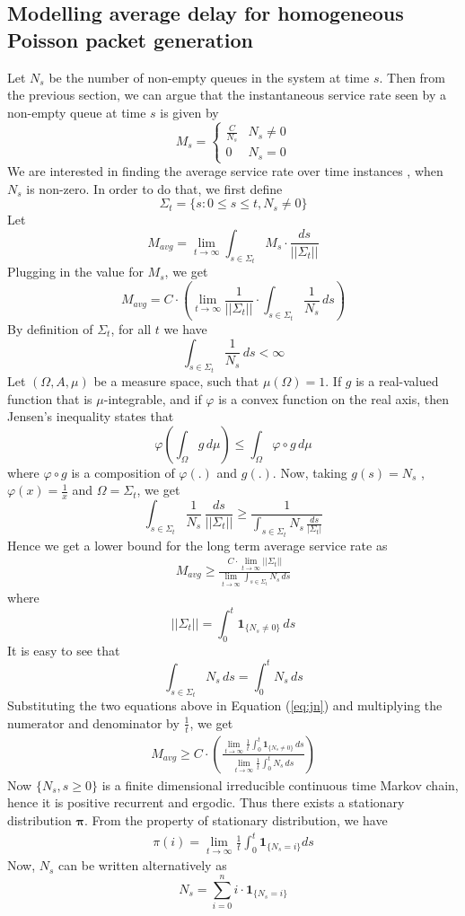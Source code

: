 \documentclass[10pt, conference, compsocconf]{IEEEtran}
\begin{document}
\subsection{Modelling average delay for homogeneous Poisson packet generation}
Let $N_s$ be the number of non-empty queues in the system at time $s$. Then from the previous section, we can argue that the instantaneous  service rate seen by a non-empty queue at time $s$ is given by
$$M_s = \begin{cases} \frac{C}{N_s} &	N_s \neq 0 \\  0 & N_s = 0 \end{cases}$$
We are interested in finding the average service rate over time instances , when $N_s$ is non-zero. In order to do that, we first define
$$\Sigma_t = \{s: 0 \leq s \leq  t, N_s \neq 0\}$$
Let
$$ M_{avg} = \lim_{t \to \infty} \int_{s \in \Sigma_t} M_s \cdot \frac{ds}{||\Sigma_t||}$$
Plugging in the value for $M_s$, we get
$$ M_{avg} = C \cdot \left(  \lim_{t \to \infty} \frac{1}{||\Sigma_t||} \cdot \int_{s \in \Sigma_t} \frac{1}{N_s} \, ds \right) $$
By definition of $\Sigma_t$, for all $t$ we have
$$ \int_{s \in \Sigma_t} \frac{1}{N_s} \,ds < \infty $$
Let $( \Omega, A, \mu)$ be a measure space, such that $\mu(\Omega) = 1$. If $g$ is a real-valued function that is $\mu$-integrable, and if $\varphi$ is a convex function on the real axis, then Jensen's  inequality states that \cite{rudin}
$$\varphi\left(\int_\Omega g\, d\mu\right) \le \int_\Omega \varphi \circ g\, d\mu $$
where $\varphi \circ g$ is a composition of $\varphi(.)$ and $g(.)$. Now, taking $g(s) = N_s$ , $\varphi(x)=\frac{1}{x}$ and $\Omega = \Sigma_t$, we get 
$$ \int_{s \in \Sigma_t} \frac{1}{N_s} \, \frac{ds}{||\Sigma_t||}  \geq  \frac{1}{\int_{s \in \Sigma_t} N_s \, \frac{ds}{|\Sigma_t|}}$$
Hence we get a lower bound for the long term average service rate as
\begin{eqnarray} \label{eq:jn}
 M_{avg} \geq \frac{C \cdot \displaystyle \lim_{t \to \infty} ||\Sigma_t||}{\displaystyle \lim_{t \to \infty} \int_{s \in \Sigma_t} N_s \, ds}
\end{eqnarray}
where 
$$ ||\Sigma_t|| = \int^t_0 \boldsymbol 1_{\{N_s \neq 0\}} \, ds$$
It is easy to see that
$$ \int_{s \in \Sigma_t} N_s \, ds =  \int^t_0 N_s \, ds $$
Substituting the two equations above in Equation (\ref{eq:jn}) and multiplying the numerator and denominator by $\frac{1}{t}$, we get
\begin{eqnarray} \label{eq:mavg}
M_{avg} \geq C \cdot \left(  \frac{\displaystyle \lim_{t \to \infty} \frac{1}{t} \int^t_0 \boldsymbol 1_{\{N_s \neq 0\}} \, ds}{\displaystyle \lim_{t \to \infty} \frac{1}{t} \int^t_0 N_s \, ds}  \right) 
\end{eqnarray}
Now $\{N_s, s \geq 0\}$ is a finite dimensional irreducible continuous time Markov chain, hence it is positive recurrent and ergodic. Thus there exists a stationary distribution $\boldsymbol\pi$. From the property of stationary distribution, we have
\begin{eqnarray} \label{eq:pi}
 \pi(i) = \lim_{t \to \infty} \frac{1}{t} \int^t_0 \boldsymbol 1_{\{ N_s = i \}} ds
\end{eqnarray}
Now, $N_s$ can be written alternatively as
$$N_s = \sum^n_{i=0} i \cdot \boldsymbol 1_{\{N_s = i\}} $$
\end{document}

